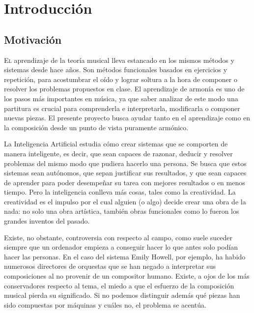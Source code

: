 \chapter{Introducción}
\label{chap:introduccion}


\section{Motivación}
 \label{sec:motivation}
  \lettrine{E}l aprendizaje de la teoría musical lleva estancado en los mismos métodos y sistemas desde hace años. Son métodos funcionales basados en ejercicios y repetición, para acostumbrar el oído y lograr soltura a la hora de componer o resolver los problemas propuestos en clase. El aprendizaje de armonía es uno de los pasos más importantes en música, ya que saber analizar de este modo una partitura es crucial para comprenderla e interpretarla, modificarla o componer nuevas piezas. El presente proyecto busca ayudar tanto en el aprendizaje como en la composición desde un punto de vista puramente armónico. 
 
 La Inteligencia Artificial estudia cómo crear sistemas que se comporten de manera inteligente, es decir, que sean capaces de razonar, deducir y resolver problemas del mismo modo que pudiera hacerlo una persona. Se busca que estos sistemas sean autónomos, que sepan justificar sus resultados, y que sean capaces de aprender para poder desempeñar su tarea con mejores resultados o en menos tiempo. Pero la inteligencia conlleva más cosas, tales como la creatividad. La creatividad es el impulso por el cual alguien (o algo) decide crear una obra de la nada: no solo una obra artística, también obras funcionales como lo fueron los grandes inventos del pasado. 
 
 Existe, no obstante, controversia con respecto al campo, como suele suceder siempre que un ordenador empieza a conseguir hacer lo que antes solo podían hacer las personas. En el caso del sistema Emily Howell\cite{experiments-musical-intelligence}, por ejemplo, ha habido numerosos directores de orquestas que se han negado a interpretar sus composiciones al no provenir de un compositor humano. Existe, a ojos de los más conservadores respecto al tema, el miedo a que el esfuerzo de la composición musical pierda su significado. Si no podemos distinguir además qué piezas han sido compuestas por máquinas y cuáles no, el problema se acentúa. 
 
